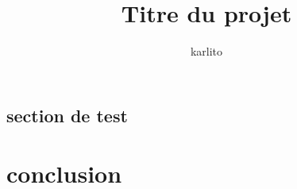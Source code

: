 \documentclass[remplissage]{karlito}
\title{Titre du projet}
\author{karlito}
\begin{document}
\maketitle
\sommaire



\section{section de test}

\begin{comment}
Pour rapel, voici quelques trucs simpas :

\begin{boite}[backcolor=none, bordercolor=black, title=Un titre qui roxx, titlecolor=black, backtitlecolor=white]

$$x=\int_{-\infty}^{+\infty}log(\dfrac{2*\pi*\overbrace{54+5}^{\mathclap{\text{constante de micouly}}}}{\underbrace{8+7}_{cst}})$$

\end{boite}

%
\end{comment}






\chapter{conclusion}



\tabledesfigures
\appendix
\end{document}
